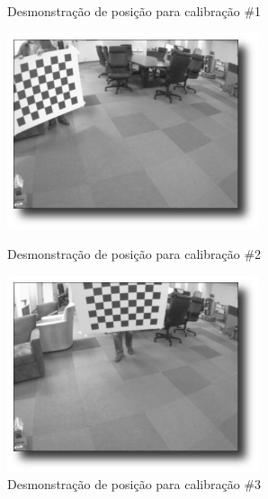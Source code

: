 \begin{figure}[H]
  \caption{Desmonstração de posição para calibração \#1 \cite{Documentacao-CalibrateMonocularCamera}}\label{fig3:14}
  \includegraphics[width=\linewidth]{Imagens/figura3-14.png}
\endminipage\hfill
{}
  \caption{Desmonstração de posição para calibração \#2 \cite{Documentacao-CalibrateMonocularCamera}}\label{fig3:15}
  \includegraphics[width=\linewidth]{Imagens/figura3-15.png}
\endminipage\hfill
{}
  \caption{Desmonstração de posição para calibração \#3 \cite{Documentacao-CalibrateMonocularCamera}}\label{fig3:16}

\end{figure}
